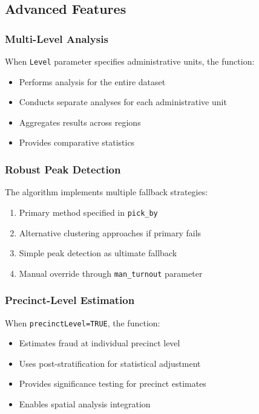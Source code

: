 \documentclass{article}
\begin{document}
\subsection{Advanced Features}

\subsubsection{Multi-Level Analysis}
When \texttt{Level} parameter specifies administrative units, the function:
\begin{itemize}
    \item Performs analysis for the entire dataset
    \item Conducts separate analyses for each administrative unit
    \item Aggregates results across regions
    \item Provides comparative statistics
\end{itemize}

\subsubsection{Robust Peak Detection}
The algorithm implements multiple fallback strategies:
\begin{enumerate}
    \item Primary method specified in \texttt{pick\_by}
    \item Alternative clustering approaches if primary fails
    \item Simple peak detection as ultimate fallback
    \item Manual override through \texttt{man\_turnout} parameter
\end{enumerate}

\subsubsection{Precinct-Level Estimation}
When \texttt{precinctLevel=TRUE}, the function:
\begin{itemize}
    \item Estimates fraud at individual precinct level
    \item Uses post-stratification for statistical adjustment
    \item Provides significance testing for precinct estimates
    \item Enables spatial analysis integration
\end{itemize}
\end{document}
